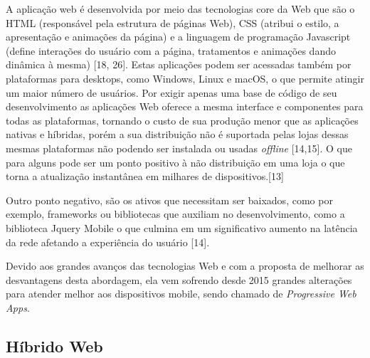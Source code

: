 A aplicação web é desenvolvida por meio das tecnologias core da Web que são o HTML (responsável pela estrutura de páginas Web), CSS (atribui o estilo, a apresentação e animações da página) e a linguagem de programação Javascript (define interações do usuário com a página, tratamentos e animações dando dinâmica à mesma) [18, 26]. Estas aplicações podem ser acessadas também por plataformas para desktops, como Windows, Linux e macOS, o que permite atingir um maior número de usuários. Por exigir apenas uma base de código de seu desenvolvimento as aplicações Web oferece a mesma interface e componentes para todas as plataformas, tornando o custo de sua produção menor que as aplicações nativas e híbridas, porém a sua distribuição não é suportada pelas lojas dessas mesmas plataformas não podendo ser instalada ou usadas \textit{offline} [14,15]. O que para alguns pode ser um ponto positivo à não distribuição em uma loja o que torna a atualização instantânea em milhares de dispositivos.[13]

Outro ponto negativo, são os ativos que necessitam ser baixados, como por exemplo, frameworks ou bibliotecas que auxiliam no desenvolvimento, como a biblioteca Jquery Mobile o que culmina em um significativo aumento na latência da rede afetando a experiência do usuário [14].

Devido aos grandes avanços das tecnologias Web e com a proposta de melhorar as desvantagens desta abordagem, ela vem sofrendo desde 2015 grandes alterações para atender melhor aos dispositivos mobile, sendo chamado de \textit{Progressive Web Apps}.


\subsection{\esp Híbrido Web}













































